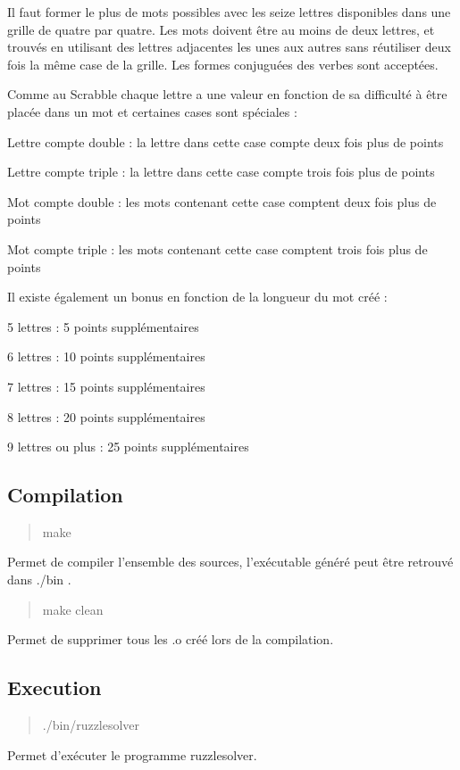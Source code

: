 Il faut former le plus de mots possibles avec les seize lettres disponibles dans une grille de quatre par quatre. Les mots doivent être au moins de deux lettres, et trouvés en utilisant des lettres adjacentes les unes aux autres sans réutiliser deux fois la même case de la grille. Les formes conjuguées des verbes sont acceptées.

Comme au Scrabble chaque lettre a une valeur en fonction de sa difficulté à être placée dans un mot et certaines cases sont spéciales \-:


\begin{DoxyItemize}
\item Lettre compte double \-: la lettre dans cette case compte deux fois plus de points
\item Lettre compte triple \-: la lettre dans cette case compte trois fois plus de points
\item Mot compte double \-: les mots contenant cette case comptent deux fois plus de points
\item Mot compte triple \-: les mots contenant cette case comptent trois fois plus de points
\end{DoxyItemize}

Il existe également un bonus en fonction de la longueur du mot créé \-:


\begin{DoxyItemize}
\item 5 lettres \-: 5 points supplémentaires
\item 6 lettres \-: 10 points supplémentaires
\item 7 lettres \-: 15 points supplémentaires
\item 8 lettres \-: 20 points supplémentaires
\item 9 lettres ou plus \-: 25 points supplémentaires
\end{DoxyItemize}

\subsection*{Compilation}

\begin{quotation}
make

\end{quotation}


Permet de compiler l'ensemble des sources, l'exécutable généré peut être retrouvé dans ./bin .

\begin{quotation}
make clean

\end{quotation}


Permet de supprimer tous les .o créé lors de la compilation.

\subsection*{Execution}

\begin{quotation}
./bin/ruzzlesolver

\end{quotation}


Permet d'exécuter le programme ruzzlesolver. 